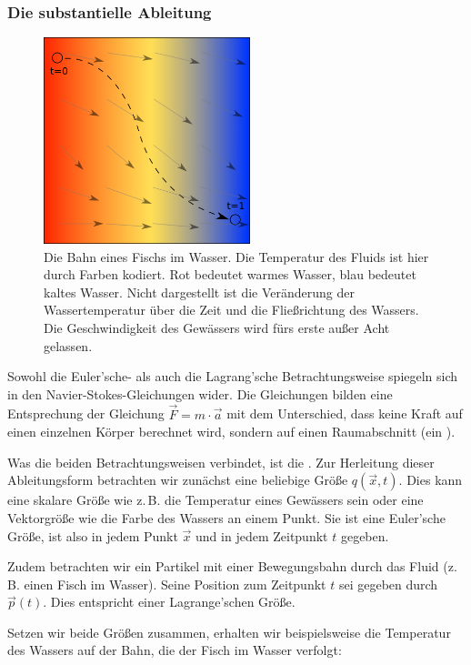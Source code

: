 \subsubsection{Die substantielle Ableitung}

\begin{figure}[ht]
\includegraphics[width=6cm]{images/swimmer_in_water}
\caption{Die Bahn eines Fischs im Wasser. Die Temperatur des Fluids ist hier durch Farben kodiert. Rot bedeutet warmes Wasser, blau bedeutet kaltes Wasser. Nicht dargestellt ist die Veränderung der Wassertemperatur über die Zeit und die Fließrichtung des Wassers. Die Geschwindigkeit des Gewässers wird fürs erste außer Acht gelassen.}
\end{figure}

Sowohl die Euler'sche- als auch die Lagrang'sche Betrachtungsweise spiegeln sich
in den Navier-Stokes-Gleichungen wider. Die Gleichungen bilden eine Entsprechung
der Gleichung $\vec{F} = m \cdot \vec{a}$ mit dem Unterschied, dass keine Kraft
auf einen einzelnen Körper berechnet wird, sondern auf einen Raumabschnitt (ein
).

Was die beiden Betrachtungsweisen verbindet, ist die
. Zur Herleitung dieser Ableitungsform
betrachten wir zunächst eine beliebige Größe $q(\vec{x},t)$. Dies kann eine
skalare Größe wie z.\,B. die Temperatur eines Gewässers sein oder eine Vektorgröße
wie die Farbe des Wassers an einem Punkt. Sie ist eine Euler'sche Größe, ist
also in jedem Punkt $\vec{x}$ und in jedem Zeitpunkt $t$ gegeben.

Zudem betrachten wir ein Partikel mit einer Bewegungsbahn durch das Fluid (z.\,B.
einen Fisch im Wasser). Seine Position zum Zeitpunkt $t$ sei gegeben durch
$\vec{p}(t)$. Dies entspricht einer Lagrange'schen Größe.

Setzen wir beide Größen zusammen, erhalten wir beispielsweise die Temperatur des
Wassers auf der Bahn, die der Fisch im Wasser verfolgt:

